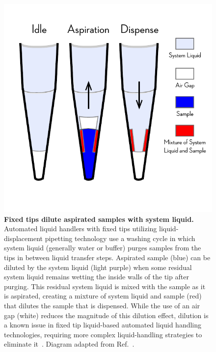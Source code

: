 \documentclass[aps,pre,twocolumn,nofootinbib,superscriptaddress,linenumbers]{revtex4-1}
\begin{document}
\begin{figure}[tb]
    \includegraphics[width=\columnwidth]{../figures/dilution_effect.pdf}

  \caption{{\bf Fixed tips dilute aspirated samples with system liquid.}
  Automated liquid handlers with fixed tips utilizing liquid-displacement pipetting technology use a washing cycle in which system liquid (generally water or buffer) purges samples from the tips in between liquid transfer steps.
  Aspirated sample (blue) can be diluted by the system liquid (light purple) when some residual system liquid remains wetting the inside walls of the tip after purging.
  This residual system liquid is mixed with the sample as it is aspirated, creating a mixture of system liquid and sample (red) that dilutes the sample that is dispensed. 
  While the use of an air gap (white) reduces the magnitude of this dilution effect, dilution is a known issue in fixed tip liquid-based automated liquid handling technologies, requiring more complex liquid-handling strategies to eliminate it~\cite{gu_dilution_2007}. 
  Diagram adapted from Ref.~\cite{gu_dilution_2007}. 
  }
  \label{fig:dilution_effect}
\end{figure}
\end{document}
